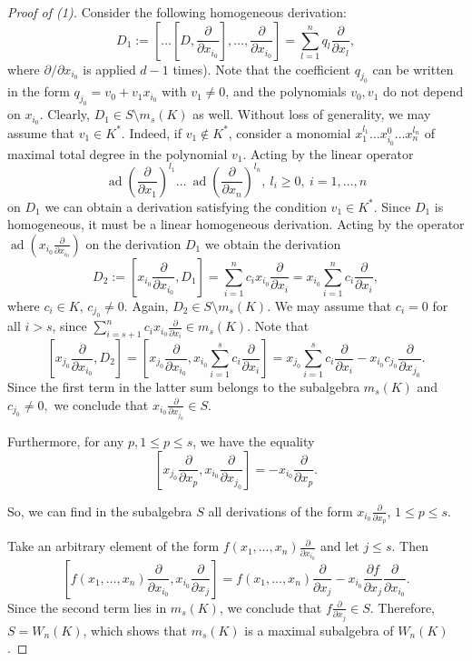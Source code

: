 \documentclass[12pt,a4paper]{amsart}
\theoremstyle{plain}
\theoremstyle{definition}
\DeclareMathOperator{\ad}{ad}
\begin{document}
\begin{proof}[Proof of (1)]
	Consider the  following homogeneous derivation:
	\[
	D_1 := 
	\left[ \dots \left[ D, \frac{\partial}{\partial x_{i_0}} \right], \dots, \frac{\partial}{\partial x_{i_0}} \right] = \sum_{l=1}^n q_l \frac{\partial}{\partial x_l}, 
	\]
	where $\partial/\partial x_{i_0}$  is applied  $d-1$ times).
	Note that the coefficient $ q_{j_0} $  can be written in the form $q_{j_0} = v_0 + v_1 x_{i_0}$ with $v_1 \neq 0$, and the polynomials $v_0, v_1$ do not depend on $x_{i_0}$.
	Clearly, $D_1 \in S \setminus m_s(K)$ as well.
	Without loss of generality, we may assume that $v_1 \in K^*$. Indeed, if $v_1 \notin K^*$,  consider
	a  monomial $x_1^{l_1} \dots x_{i_0}^0 \dots x_n^{l_n}$ of maximal total degree  in the polynomial $v_1$. Acting by the linear operator 
	$$\ad(\frac{\partial}{\partial x_1})^{l_1} \dots \ \ad(\frac{\partial}{\partial x_n})^{l_n}, \  l_i\geq 0, \  i=1, \ldots , n$$ on $D_1 $
	we can obtain a derivation satisfying the condition $v_1 \in K^*$.
	Since $D_1$ is  homogeneous, it must be a linear homogeneous derivation. Acting by the operator $\ad(x_{i_0} \frac{\partial}{\partial x_{i_0}})$
	on the derivation $D_1$ we obtain the derivation 
	\[
	D_2:= \left[x_{i_0} \frac{\partial}{\partial x_{i_0}}, D_1 \right] = \sum_{i=1}^n c_i x_{i_0} \frac{\partial}{\partial x_{i}}
	=  x_{i_0}\sum_{i=1}^n c_i \frac{\partial}{\partial x_{i}},
	\]
	where $c_i \in K$, $c_{j_0} \ne 0$.
	Again, $D_2 \in S \setminus m_s(K)$. We may assume that $c_i = 0$ for all $i > s$, since 
	$\sum_{i=s+1}^n c_i x_{i_0} \frac{\partial}{\partial x_{i}} \in m_s(K)$.
	Note that
	\[
	\left[x_{j_0} \frac{\partial}{\partial x_{i_0}}, D_2 \right] = 
	\left[ x_{j_0} \frac{\partial}{\partial x_{i_0}}, x_{i_0}\sum_{i=1}^{s} c_i \frac{\partial}{\partial x_i} \right] = 
	x_{j_0} \sum_{i=1}^{s} c_i \frac{\partial}{\partial x_i} - x_{i_0} c_{j_0} \frac{\partial}{\partial x_{j_0}}.
	\]
	Since the first term in the latter sum belongs to  the subalgebra $m_s(K)$ and $c_{j_0} \ne 0,$ we  conclude that 
	$x_{i_0} \frac{\partial}{\partial x_{j_0}} \in S$.
	
	Furthermore, for any $p, 1 \le p \le s $,  we have  the equality
	$$\left[ x_{j_0} \frac{\partial}{\partial x_p}, 
	x_{i_0} \frac{\partial}{\partial x_{j_0}} \right] = 
	-x_{i_0} \frac{\partial}{\partial x_p}.$$ 
	 
	So, we can find in the subalgebra $S$ all  derivations of the form $x_{i_0} \frac{\partial}{\partial x_p}$, $1 \le p \le s$.
	
	Take an arbitrary  element of the form $f(x_1, \dots, x_n) \frac{\partial}{\partial x_{i_0}}$ and let $j \le s$.
	Then 
	$$\left[ f(x_1, \dots, x_n) \frac{\partial}{\partial x_{i_0}}, 
	x_{i_0} \frac{\partial}{\partial x_{j}} \right] = 
	f(x_1, \dots, x_n) \frac{\partial}{\partial x_{j}} - 
	x_{i_0} \frac{\partial f}{\partial x_j} \frac{\partial}{\partial x_{i_0}}.$$
	Since the second term lies in $m_s(K)$, 
	we conclude that $f \frac{\partial}{\partial x_{j}} \in S$. Therefore, $S = W_n(K)$, which shows that  
	$m_s(K)$ is a maximal subalgebra of $W_n(K)$.
\end{proof}
\end{document}
